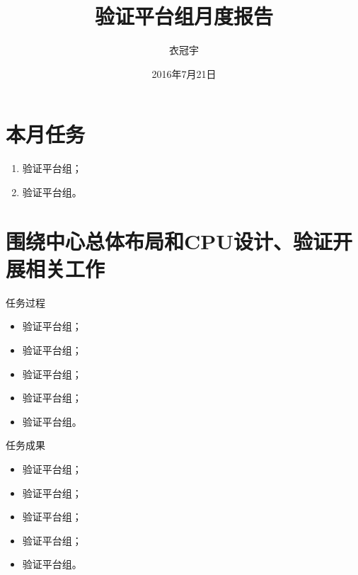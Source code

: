 \documentclass[cjk]{beamer}
\title[中国科学院通用芯片与基础软件研究中心 CPU and OS Research Center CAS]{验证平台组月度报告} %
\author{衣冠宇} %
\institute[CAS] %
{
  中国科学院通用芯片与基础软件研究中心 \\ %
  \medskip
  验证平台组
}
\date{2016年7月21日} %
\begin{document}
\begin{CJK}{UTF8}{gbsn}

  \begin{frame}
    \titlepage %
  \end{frame}


  \section{本月任务} %

  \begin{frame}
    \begin{enumerate}
    \item 验证平台组；
    \item 验证平台组。
    \end{enumerate}
  \end{frame}

  \section{围绕中心总体布局和CPU设计、验证开展相关工作}

  \begin{frame}
    \begin{block}{任务过程}
      \begin{itemize}
      \item 验证平台组；
      \item 验证平台组；
      \item 验证平台组；
      \item 验证平台组；
      \item 验证平台组。
      \end{itemize}
    \end{block}

    \begin{block}{任务成果}
      \begin{itemize}
      \item 验证平台组；
      \item 验证平台组；
      \item 验证平台组；
      \item 验证平台组；
      \item 验证平台组。
      \end{itemize}
    \end{block}
  \end{frame}


\end{CJK}
\end{document}

